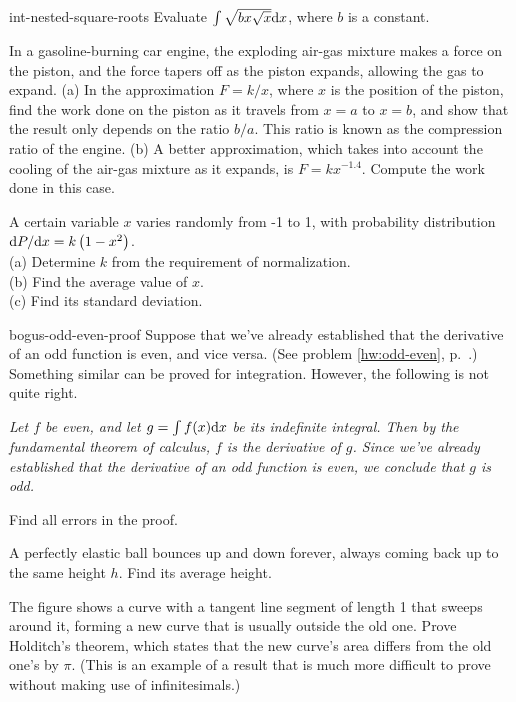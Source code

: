 \begin{hwsection}
\begin{hwwithsoln}{int-nested-square-roots}
Evaluate $\int\sqrt{bx\sqrt{x}}\textup{d} x$, where $b$ is a constant.
\end{hwwithsoln}

\begin{hw}\label{hw:piston}
In a gasoline-burning car engine, the exploding air-gas
mixture makes a force on the piston, and the force tapers off as the piston expands, allowing the
gas to expand. (a) In the approximation $F=k/x$, where $x$ is the position of the piston, find the
work done on the piston as it travels from $x=a$ to $x=b$, and show that the result only depends
on the ratio $b/a$. This ratio is known as the compression ratio of the engine. (b) A better
approximation, which takes into account the cooling of the air-gas mixture as it expands, is
$F=kx^{-1.4}$. Compute the work done in this case.
\end{hw}


\begin{hw}
A certain variable $x$ varies randomly from -1 to 1, with probability distribution
$\textup{d} P/\textup{d} x=k\left(1-x^2\right)$.\\
(a) Determine $k$ from the requirement of normalization.\\
(b) Find the average value of $x$.\\
(c) Find its standard deviation.
\end{hw}

\begin{hwwithsoln}{bogus-odd-even-proof}
Suppose that we've already established that the derivative of an odd function is even, and vice versa.
(See problem \ref{hw:odd-even}, p.~\pageref{hw:odd-even}.) Something similar can be proved for integration.
However, the following is not quite right.

\emph{Let $f$ be even, and let $g=\int f(x)\textup{d} x$ be its indefinite integral. Then by the fundamental theorem
of calculus, $f$ is the derivative of $g$. Since we've already established that the derivative of an odd
function is even, we conclude that $g$ is odd.}

Find all errors in the proof.
\end{hwwithsoln}

\begin{hw}[2]
A perfectly elastic ball bounces up and down forever, always coming back up to the same height $h$. Find
its average height.
\end{hw}


\begin{hw}[2]\label{hw:holditch}
The figure shows a curve with a tangent line segment of length 1 that sweeps around it, forming a new curve
that is usually outside the old one.
Prove Holditch's theorem, which states that the  new curve's area differs from the old one's
by $\pi$.
(This is an example of a result that is much more
difficult to prove without making use of infinitesimals.)
\end{hw}

\end{hwsection}
